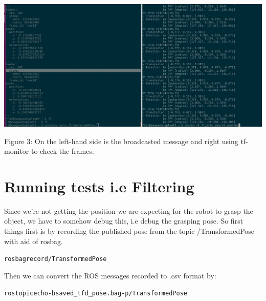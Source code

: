 \documentclass{article}
\begin{document}
\begin{center}
  \includegraphics[scale=0.3]{pic3.jpeg}

  Figure 3:  On the left-hand side is the broadcasted message and right using tf-monitor to check the frames.
\end{center}

\section{Running tests i.e Filtering}
Since we're not getting the position we are expecting for the robot to grasp the object, we have to somehow debug this, i.e debug the grasping pose. So first things first is by recording the published pose from the topic /TransformedPose with aid of rosbag.
\begin{alltt}
    rosbag record /TransformedPose
\end{alltt}
Then we can convert the ROS messages recorded to .csv format by:
\begin{alltt}
    rostopic echo -b saved_tfd_pose.bag -p /TransformedPose
\end{alltt}
\end{document}
